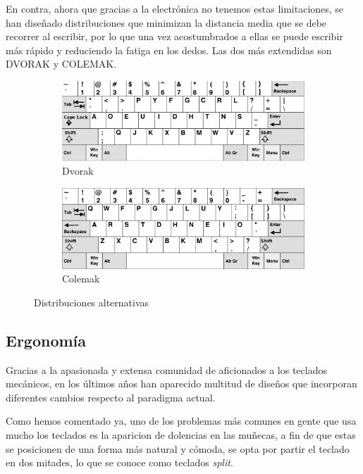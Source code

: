     En contra, ahora que gracias a la electrónica no tenemos estas limitaciones, se han diseñado distribuciones que minimizan la distancia media que se debe recorrer al escribir, por lo que una vez    acostumbrados a ellas se puede escribir más rápido y reduciendo la fatiga en los dedos. Las dos más extendidas son DVORAK y COLEMAK. 
    \begin{figure}[H]
        \begin{subfigure}[b]{.5\textwidth}
            \centering
            \includegraphics[width=.6\textwidth]{images/dvorak}
            \caption{Dvorak}
        \end{subfigure} 
        \hfill
        \begin{subfigure}[b]{.5\textwidth}
            \centering
            \includegraphics[width=.6\textwidth]{images/colemak}
            \caption{Colemak}
        \end{subfigure}
        \caption{Distribuciones alternativas}
    \end{figure}

\subsection{Ergonomía}
Gracias a la apasionada y extensa comunidad de aficionados a los teclados mecánicos, en los últimos años han aparecido multitud de diseños que incorporan diferentes cambios respecto al paradigma actual.\newline

Como hemos comentado ya, uno de los problemas más comunes en gente que usa mucho los teclados es la aparicion de dolencias en las muñecas, a fin de que estas se posicionen de una forma más natural y cómoda, se opta por partir el teclado en dos mitades, lo que se conoce como teclados \textit{split}.

